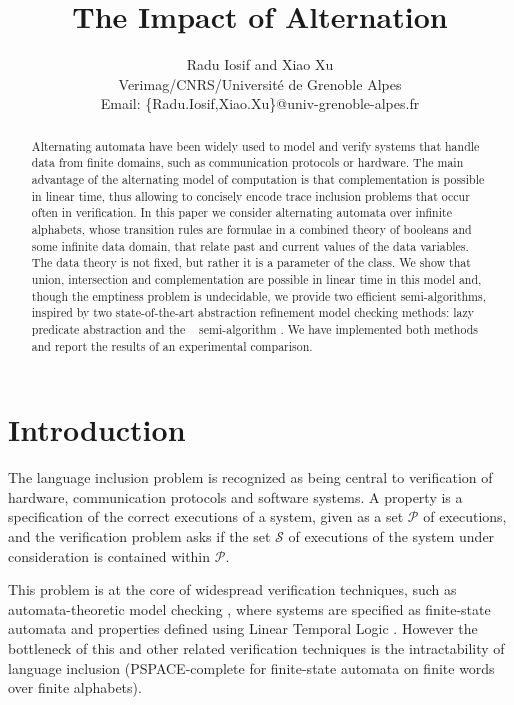 \documentclass[10pt,conference,letterpaper,twocolumn]{IEEEtran}
\begin{document}

\title{The Impact of Alternation}

\author{Radu Iosif and Xiao Xu \\
Verimag/CNRS/Universit\'e de Grenoble Alpes\\
Email: \{Radu.Iosif,Xiao.Xu\}@univ-grenoble-alpes.fr}

\maketitle

\begin{abstract}
Alternating automata have been widely used to model and verify systems
that handle data from finite domains, such as communication protocols
or hardware. The main advantage of the alternating model of
computation is that complementation is possible in linear time, thus
allowing to concisely encode trace inclusion problems that occur often
in verification. In this paper we consider alternating automata over
infinite alphabets, whose transition rules are formulae in a combined
theory of booleans and some infinite data domain, that relate past and
current values of the data variables. The data theory is not fixed,
but rather it is a parameter of the class. We show that union,
intersection and complementation are possible in linear time in this
model and, though the emptiness problem is undecidable, we provide two
efficient semi-algorithms, inspired by two state-of-the-art
abstraction refinement model checking methods: lazy predicate
abstraction \cite{HJMS02} and the \impact~ semi-algorithm
\cite{mcmillan06}. We have implemented both methods and report the
results of an experimental comparison.
\end{abstract}

\section{Introduction}

The language inclusion problem is recognized as being central to
verification of hardware, communication protocols and software
systems. A property is a specification of the correct executions of a
system, given as a set $\mathcal{P}$ of executions, and the
verification problem asks if the set $\mathcal{S}$ of executions of
the system under consideration is contained within $\mathcal{P}$.

This problem is at the core of widespread verification techniques,
such as automata-theoretic model checking \cite{VARDI94}, where
systems are specified as finite-state automata and properties defined
using Linear Temporal Logic \cite{Pnueli77}. However the bottleneck of
this and other related verification techniques is the intractability
of language inclusion (PSPACE-complete for finite-state automata on
finite words over finite alphabets).
\end{document}
